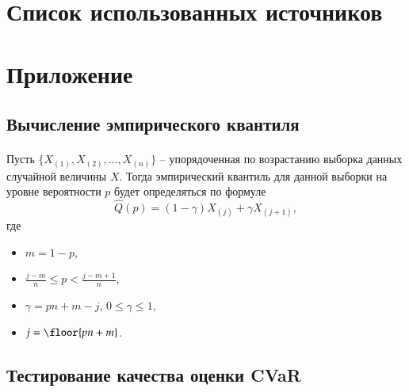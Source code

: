\documentclass[aspectratio=169]{beamer}
\begin{document}



\section{Список использованных источников}

    

\section{Приложение}

\subsection{Вычисление эмпирического квантиля}

\begin{frame}{\insertsection}
    \framesubtitle{\insertsubsection}
    Пусть $\{X_{(1)}, X_{(2)}, \ldots, X_{(n)}\}$ -- упорядоченная по возрастанию выборка данных случайной величины $X$.
    Тогда эмпирический квантиль для данной выборки на уровне вероятности $p$ будет определяться по формуле~\cite{Hyndman96}
    \begin{equation}
        \hat{Q} (p) = (1 - \gamma) X_{(j)} + \gamma X_{(j+1)},
    \end{equation}
    где 
    \begin{itemize}
        \item $m = 1 - p$,
        \item $\frac{j-m}{n} \le p < \frac{j-m+1}{n}$,
        \item $\gamma = pn + m - j$, $0 \le \gamma \le 1$,
        \item $j = \floor{pn + m}$.
    \end{itemize}
\end{frame}

\subsection{Тестирование качества оценки CVaR}
\end{document}
